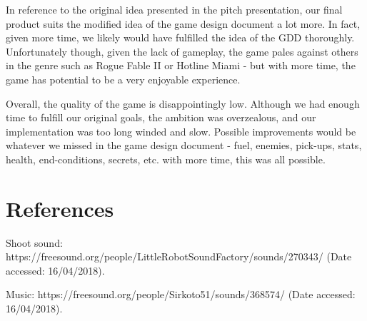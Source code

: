 \documentclass[12pt]{article}
\begin{document}
In reference to the original idea presented in the pitch presentation, our final product suits the modified idea of the game design document a lot more. In fact, given more time, we likely would have fulfilled the idea of the GDD thoroughly. Unfortunately though, given the lack of gameplay, the game pales against others in the genre such as Rogue Fable II or Hotline Miami - but with more time, the game has potential to be a very enjoyable experience. \newline

Overall, the quality of the game is disappointingly low. Although we had enough time to fulfill our original goals, the ambition was overzealous, and our implementation was too long winded and slow. Possible improvements would be whatever we missed in the game design document - fuel, enemies, pick-ups, stats, health, end-conditions, secrets, etc. with more time, this was all possible.

\clearpage

\section{References}

Shoot sound: https://freesound.org/people/LittleRobotSoundFactory/sounds/270343/
(Date accessed: 16/04/2018).

\hspace{1cm}

Music: https://freesound.org/people/Sirkoto51/sounds/368574/
(Date accessed: 16/04/2018).
\end{document}
